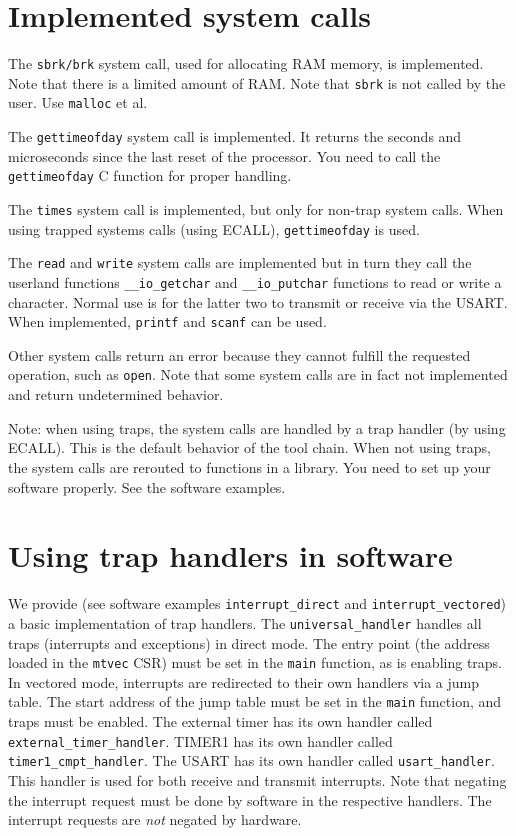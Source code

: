 \documentclass[12pt]{article}
\begin{document}
\section{Implemented system calls}
The \texttt{sbrk/brk} system call, used for allocating RAM memory, is implemented. Note that there is a limited amount of RAM. Note that \texttt{sbrk} is not called by the user. Use \texttt{malloc} et al.

The \texttt{gettimeofday} system call is implemented. It returns the seconds and microseconds since the last reset of the processor. You need to call the \texttt{gettimeofday} C function for proper handling. %

The \texttt{times} system call is implemented, but only for non-trap system calls. When using trapped systems calls (using ECALL), \texttt{gettimeofday} is used.

The \texttt{read} and \texttt{write} system calls are implemented but in turn they call the userland functions \texttt{\_\_io\_getchar} and \texttt{\_\_io\_putchar} functions to read or write a character. Normal use is for the latter two to transmit or receive via the USART. When implemented, \texttt{printf} and \texttt{scanf} can be used.

Other system calls return an error because they cannot fulfill the requested operation, such as \texttt{open}. Note that some system calls are in fact not implemented and return undetermined behavior. 

Note: when using traps, the system calls are handled by a trap handler (by using ECALL). This is the default behavior of the tool chain. When not using traps, the system calls are rerouted to functions in a library. You need to set up your software properly. See the software examples.

\section{Using trap handlers in software}
We provide (see software examples \texttt{interrupt\_direct} and \texttt{interrupt\_vectored}) a basic implementation of trap handlers. The \texttt{universal\_handler} handles all traps (interrupts and exceptions) in direct mode. The entry point (the address loaded in the \texttt{mtvec} CSR) must be set in the \texttt{main} function, as is enabling traps. In vectored mode, interrupts are redirected to their own handlers via a jump table. The start address of the jump table must be set in the \texttt{main} function, and traps must be enabled. The external timer has its own handler called \texttt{external\_timer\_handler}. TIMER1 has its own handler called \texttt{timer1\_cmpt\_handler}. The USART has its own handler called \texttt{usart\_handler}. This handler is used for both receive and transmit interrupts. Note that negating the interrupt request must be done by software in the respective handlers. The interrupt requests are \emph{not} negated by hardware.
\end{document}

